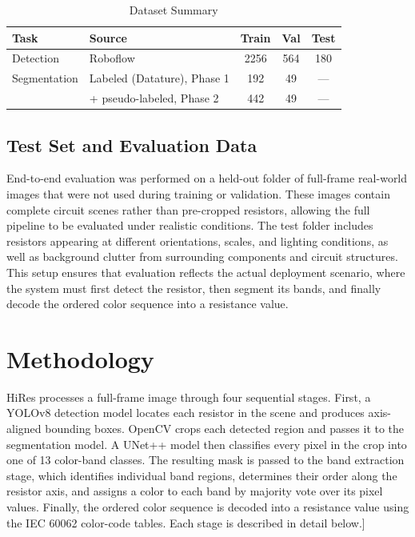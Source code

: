\documentclass[conference]{IEEEtran}
\begin{document}
\begin{table}[!t]
  \caption{Dataset Summary}
  \label{tab:datasets}
  \centering
  \renewcommand{\arraystretch}{1.15}
  \begin{tabular}{@{}llccc@{}}
    \toprule
    \textbf{Task} & \textbf{Source} & \textbf{Train} & \textbf{Val} & \textbf{Test} \\
    \midrule
    Detection & Roboflow & 2256 & 564 & 180 \\
    \midrule
    Segmentation & Labeled (Datature), Phase 1 & 192 & 49 & --- \\
                 & + pseudo-labeled, Phase 2 & 442 & 49 & --- \\
    \bottomrule
  \end{tabular}
\end{table}

\subsection{Test Set and Evaluation Data}

End-to-end evaluation was performed on a held-out folder of full-frame real-world images that were not used during training or validation. These images contain complete circuit scenes rather than pre-cropped resistors, allowing the full pipeline to be evaluated under realistic conditions. The test folder includes resistors appearing at different orientations, scales, and lighting conditions, as well as background clutter from surrounding components and circuit structures. This setup ensures that evaluation reflects the actual deployment scenario, where the system must first detect the resistor, then segment its bands, and finally decode the ordered color sequence into a resistance value.

\section{Methodology}
\label{sec:method}
HiRes processes a full-frame image through four sequential stages. First, a YOLOv8 detection model locates each resistor in the scene and produces axis-aligned bounding boxes. OpenCV crops each detected region and passes it to the segmentation model. A UNet++ model then classifies every pixel in the crop into one of 13 color-band classes. The resulting mask is passed to the band extraction stage, which identifies individual band regions, determines their order along the resistor axis, and assigns a color to each band by majority vote over its pixel values. Finally, the ordered color sequence is decoded into a resistance value using the IEC 60062 color-code tables. Each stage is described in detail below.]
\end{document}
